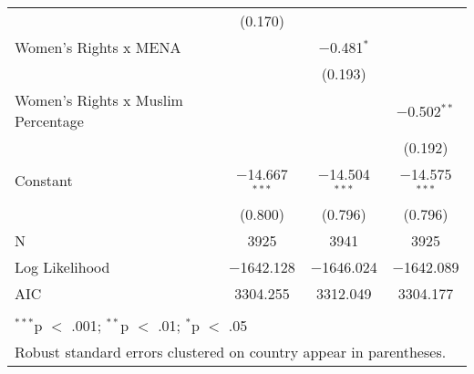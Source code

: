 \begin{table}[!htbp]
\begin{tabular}{@{\extracolsep{5pt}}lccc}
  & (0.170) &  &  \\ 
  Women's Rights x MENA &  & $-$0.481$^{*}$ &  \\ 
  &  & (0.193) &  \\ 
  Women's Rights x Muslim Percentage &  &  & $-$0.502$^{**}$ \\ 
  &  &  & (0.192) \\ 
  Constant & $-$14.667$^{***}$ & $-$14.504$^{***}$ & $-$14.575$^{***}$ \\ 
  & (0.800) & (0.796) & (0.796) \\ 
 N & 3925 & 3941 & 3925 \\ 
Log Likelihood & $-$1642.128 & $-$1646.024 & $-$1642.089 \\ 
AIC & 3304.255 & 3312.049 & 3304.177 \\ 
\hline \\[-1.8ex] 
\multicolumn{4}{l}{$^{***}$p $<$ .001; $^{**}$p $<$ .01; $^{*}$p $<$ .05} \\ 
\multicolumn{4}{l}{Robust standard errors clustered on country appear in parentheses.} \\ 
\end{tabular} 
\end{table} 
